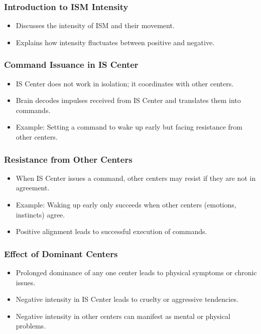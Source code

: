 \begin{frame}[fragile]\frametitle{Introduction to ISM Intensity}
    \begin{itemize}
        \item Discusses the intensity of ISM and their movement.
        \item Explains how intensity fluctuates between positive and negative.
    \end{itemize}
\end{frame}

\begin{frame}[fragile]\frametitle{Command Issuance in IS Center}
    \begin{itemize}
        \item IS Center does not work in isolation; it coordinates with other centers.
        \item Brain decodes impulses received from IS Center and translates them into commands.
        \item Example: Setting a command to wake up early but facing resistance from other centers.
    \end{itemize}
\end{frame}

\begin{frame}[fragile]\frametitle{Resistance from Other Centers}
    \begin{itemize}
        \item When IS Center issues a command, other centers may resist if they are not in agreement.
        \item Example: Waking up early only succeeds when other centers (emotions, instincts) agree.
        \item Positive alignment leads to successful execution of commands.
    \end{itemize}
\end{frame}

\begin{frame}[fragile]\frametitle{Effect of Dominant Centers}
    \begin{itemize}
        \item Prolonged dominance of any one center leads to physical symptoms or chronic issues.
        \item Negative intensity in IS Center leads to cruelty or aggressive tendencies.
        \item Negative intensity in other centers can manifest as mental or physical problems.
    \end{itemize}
\end{frame}

